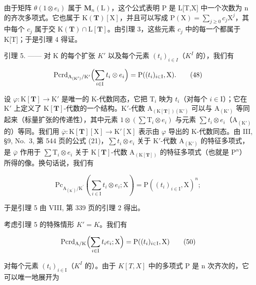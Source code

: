 由于矩阵 \(\theta(1\otimes e_{i})\) 属于 \(\mathbf{M}_{n}(\mathrm{L})\)，这个公式表明 P 是 L{[}T,X{]} 中一个次数为 n 的齐次多项式。它也属于 \(\mathrm{K}(\mathbf{T})[\mathrm{X}]\)，并且可以写成 \(\mathrm{P}(\mathrm{X})=\sum_{j\geqslant0}c_{j}\mathrm{X}^{j}\)，其中每个 \(c_{j}\) 属于交 \(\mathrm{K}(\mathbf{T})\cap\mathrm{L}[\mathbf{T}]\)。由引理 3，这些元素 \(c_{j}\) 中的每一个都属于 K{[}T{]}；于是引理 4 得证。

引理 5. —— 对 K 的每个扩张 \(K'\) 以及每个元素 \((t_{i})_{i\in I}\)（\(K^{I}\) 的），我们有

\[
\mathrm{Pcrd} _ {\mathrm{A} _ {(\mathrm{K} ^ {\prime})} / \mathrm{K} ^ {\prime}} \Bigl (\sum_ {i \in \mathrm{I}} t _ {i} \otimes e _ {i} \Bigr) = \mathrm{P} ((t _ {i}) _ {i \in \mathrm{I}}, \mathrm{X}).\tag{48}
\]

设 \(\varphi : \mathrm{K}[\mathbf{T}] \to \mathrm{K}'\) 是唯一的 K-代数同态，它把 \(\mathrm{T}_i\) 映为 \(t_i\)（对每个 \(i \in \mathrm{I}\)）；它在 \(\mathrm{K}'\) 上定义了 \(\mathrm{K}[\mathbf{T}]\)-代数的一个结构。\(\mathrm{K}'\)-代数 \(\mathrm{A}_{(\mathrm{K}[\mathbf{T}])(\mathrm{K}')}\) 可以与 \(\mathrm{A}_{(\mathrm{K}')}\) 等同起来（标量扩张的传递性），其中元素 \(1 \otimes (\sum \mathrm{T}_i \otimes e_i)\) 与元素 \(\sum t_i \otimes e_i\)（\(\mathrm{A}_{(\mathrm{K}')}\) 的）等同。我们用 \(\overline{\varphi}: \mathrm{K}[\mathbf{T}][\mathrm{X}] \to \mathrm{K}'[\mathrm{X}]\) 表示由 \(\varphi\) 导出的 K-代数同态。由 III, §9, No.~3, 第 544 页的公式 (21)，\(\sum t_i \otimes e_i\) 关于 \(\mathrm{K}'\)-代数 \(\mathrm{A}_{(\mathrm{K}')}\) 的特征多项式，是 \(\overline{\varphi}\) 作用于 \(\sum \mathrm{T}_i \otimes e_i\) 关于 \(\mathrm{K}[\mathbf{T}]\)-代数 \(\mathrm{A}_{(\mathrm{K}[\mathbf{T}])}\) 的特征多项式（也就是 \(\mathrm{P}^n\)）所得的像。换句话说，我们有

\[
\mathrm{Pc} _ {\mathrm{A} _ {(\mathrm{K} ^ {\prime})} / \mathrm{K} ^ {\prime}} \left(\sum_ {i \in \mathrm{I}} t _ {i} \otimes e _ {i}; \mathrm{X}\right) = \mathrm{P} ((t _ {i}) _ {i \in \mathrm{I}}, \mathrm{X}) ^ {n};\tag{49}
\]

于是引理 5 由 VIII, 第 339 页的引理 2 得出。

考虑引理 5 的特殊情形 \(K' = K\)。我们有

\[
\mathrm{Pcrd} _ {\mathrm{A/K}} \Bigl (\sum_ {i \in \mathrm{I}} t _ {i} e _ {i}; \mathrm{X} \Bigr) = \mathrm{P} ((t _ {i}) _ {i \in \mathrm{I}}, \mathrm{X})\tag{50}
\]

对每个元素 \((t_{i})_{i\in\mathrm{I}}\)（\(K^{I}\) 的）。由于 \(K[T,X]\) 中的多项式 P 是 n 次齐次的，它可以唯一地展开为

